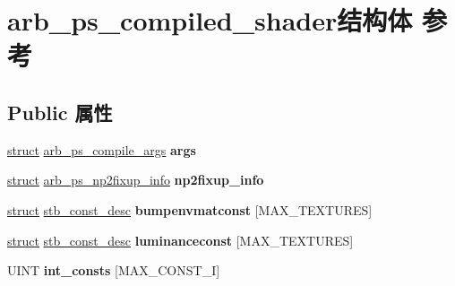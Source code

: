 \hypertarget{structarb__ps__compiled__shader}{}\section{arb\+\_\+ps\+\_\+compiled\+\_\+shader结构体 参考}
\label{structarb__ps__compiled__shader}
\subsection*{Public 属性}
\begin{DoxyCompactItemize}
\item 
\mbox{\label{structarb__ps__compiled__shader_a55915a77edd19622fb72710fecd16288}} 
\hyperlink{interfacestruct}{struct} \hyperlink{structarb__ps__compile__args}{arb\+\_\+ps\+\_\+compile\+\_\+args} {\bfseries args}
\item 
\mbox{\label{structarb__ps__compiled__shader_a6bf79458fbc424680352fbb8dd598097}} 
\hyperlink{interfacestruct}{struct} \hyperlink{structarb__ps__np2fixup__info}{arb\+\_\+ps\+\_\+np2fixup\+\_\+info} {\bfseries np2fixup\+\_\+info}
\item 
\mbox{\label{structarb__ps__compiled__shader_a980ae3ff5c52021582dba32a821a0950}} 
\hyperlink{interfacestruct}{struct} \hyperlink{structstb__const__desc}{stb\+\_\+const\+\_\+desc} {\bfseries bumpenvmatconst} \mbox{[}M\+A\+X\+\_\+\+T\+E\+X\+T\+U\+R\+ES\mbox{]}
\item 
\mbox{\label{structarb__ps__compiled__shader_afd6e2842cdeb8bae52ffe1a35defdbf3}} 
\hyperlink{interfacestruct}{struct} \hyperlink{structstb__const__desc}{stb\+\_\+const\+\_\+desc} {\bfseries luminanceconst} \mbox{[}M\+A\+X\+\_\+\+T\+E\+X\+T\+U\+R\+ES\mbox{]}
\item 
\mbox{\label{structarb__ps__compiled__shader_a9f357e28a6786129c86ed378d806c542}} 
U\+I\+NT {\bfseries int\+\_\+consts} \mbox{[}M\+A\+X\+\_\+\+C\+O\+N\+S\+T\+\_\+I\mbox{]}
\item 
\mbox{\label{structarb__ps__compiled__shader_a208f17812d75dab977e5777abde0b037}} 

\end{DoxyCompactItemize}
